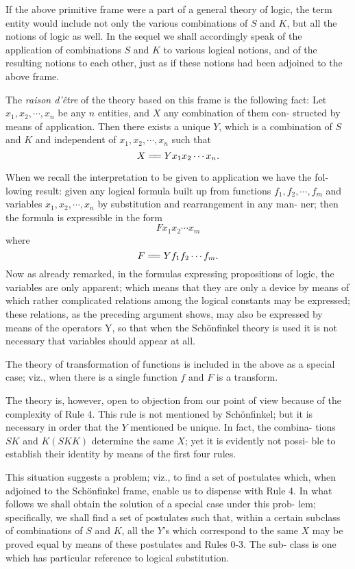 \documentclass[10pt, twoside]{extarticle}
\newcommand{\td}[2][] {\todo[tickmarkheight=3pt, inline, size=\tiny, #1]{#2}}
\newcommand\longeq{=\joinrel=}
\theoremstyle{breaktheorem}
\theoremstyle{mylemma}
\theoremstyle{mydefinition}
\theoremstyle{mycorollary}
\begin{document}
If the above primitive frame were a part of a general theory of logic, the
term entity would include not only the various combinations of \(S\) and \(K\), but
all the notions of logic as well. In the sequel we shall accordingly speak of
the application of combinations \(S\) and \(K\) to various logical notions, and of the
resulting notions to each other, just as if these notions had been adjoined to
the above frame.

The \textit{raison d'être} of the theory based on this frame is the following fact:
Let \(x_1, x_2,\cdots, x_n\) be any \(n\) entities, and \(X\) any combination of them con-
structed by means of application. Then there exists a unique \(Y\), which is a
combination of \(S\) and \(K\) and independent of \(x_1, x_2,\cdots, x_n\) such that
\[X \longeq Y x_1 x_2 \cdots x_n.\]

When we recall the interpretation to be given to application we have the fol-
lowing result: given any logical formula built up from functions \(f_1, f_2,\cdots, f_m\)
and variables \(x_1, x_2,\cdots, x_n\) by substitution and rearrangement in any man-
ner; then the formula is expressible in the form
\[Fx_1x_2\cdots x_m\]
where
\[F\longeq Yf_1f_2\cdots f_m.\]
Now as already remarked, in the formulas expressing propositions of logic,
the variables are only apparent; which means that they are only a device by
means of which rather complicated relations among the logical constants
may be expressed; these relations, as the preceding argument shows, may also
be expressed by means of the operators Y, so that when the Schönfinkel theory
is used it is not necessary that variables should appear at all.

The theory of transformation of functions is included in the above as a
special case; viz., when there is a single function \(f\) and \(F\) is a transform.

The theory is, however, open to objection from our point of view because
of the complexity of Rule 4\td{link}. This rule is not mentioned by Schönfinkel; but
it is necessary in order that the \(Y\) mentioned be unique. In fact, the combina-
tions \(SK\) and \(K(SKK)\) determine the same \(X\); yet it is evidently not possi-
ble to establish their identity by means of the first four rules.

This situation suggests a problem; viz., to find a set of postulates which,
when adjoined to the Schönfinkel frame, enable us to dispense with Rule 4.
In what follows we shall obtain the solution of a special case under this prob-
lem; specifically, we shall find a set of postulates such that, within a certain
subclass of combinations of \(S\) and \(K\), all the \(Y\)'s which correspond
to the same \(X\) may be proved equal by means of these postulates and Rules 0-3. The sub-
class is one which has particular reference to logical substitution.
\end{document}
